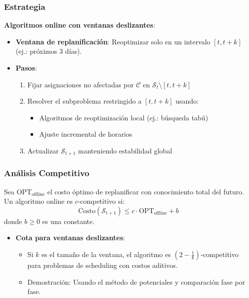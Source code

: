 \documentclass[12pt, a4paper]{article}
\begin{document}
\subsubsection*{Estrategia}
\textbf{Algoritmos online con ventanas deslizantes}:
\begin{itemize}
    \item \textbf{Ventana de replanificación}: Reoptimizar solo en un intervalo \( [t, t+k] \) (ej.: próximos 3 días).
    \item \textbf{Pasos}:
    \begin{enumerate}
        \item Fijar asignaciones no afectadas por \( \mathcal{C} \) en \( \mathcal{S}_t \setminus [t, t+k] \)
        \item Resolver el subproblema restringido a \( [t, t+k] \) usando:
        \begin{itemize}
            \item Algoritmos de reoptimización local (ej.: búsqueda tabú)
            \item Ajuste incremental de horarios
        \end{itemize}
        \item Actualizar \( \mathcal{S}_{t+1} \) manteniendo estabilidad global
    \end{enumerate}
\end{itemize}

\subsubsection*{Análisis Competitivo}
Sea \( \text{OPT}_{\text{offline}} \) el costo óptimo de replanificar con conocimiento total del futuro. Un algoritmo online es \( c \)-competitivo si:
\[
\text{Costo}(\mathcal{S}_{t+1}) \leq c \cdot \text{OPT}_{\text{offline}} + b
\]
donde \( b \geq 0 \) es una constante.

\begin{itemize}
    \item \textbf{Cota para ventanas deslizantes}: 
    \begin{itemize}
        \item Si \( k \) es el tamaño de la ventana, el algoritmo es \( (2 - \frac{1}{k}) \)-competitivo para problemas de scheduling con costos aditivos.
        \item Demostración: Usando el método de potenciales y comparación fase por fase.
    \end{itemize}
\end{itemize}
\end{document}
